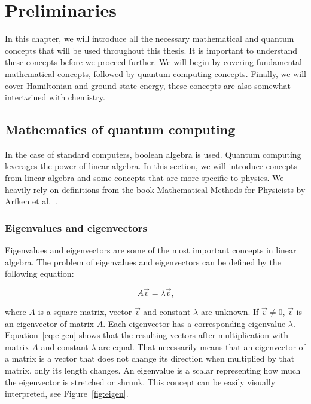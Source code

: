 \graphicspath{ {../images/}}

\chapter{Preliminaries}\label{ch:preliminaries}
In this chapter, we will introduce all the necessary mathematical and quantum concepts that will be used throughout this thesis. It is important to understand these concepts before we proceed further. We will begin by covering fundamental mathematical concepts, followed by quantum computing concepts. Finally, we will cover Hamiltonian and ground state energy, these concepts are also somewhat intertwined with chemistry.

\section{Mathematics of quantum computing}
In the case of standard computers, boolean algebra is used. Quantum computing leverages the power of linear algebra. In this section, we will introduce concepts from linear algebra and some concepts that are more specific to physics. We heavily rely on definitions from the book Mathematical Methods for Physicists by Arfken et al.~\cite{mmp}.

\subsection*{Eigenvalues and eigenvectors}
Eigenvalues and eigenvectors are some of the most important concepts in linear algebra. The problem of eigenvalues and eigenvectors can be defined by the following equation:

\begin{equation}
  A\vec{v} = \lambda \vec{v}\text{,}
  \label{eq:eigen}
\end{equation}

\noindent where $A$ is a square matrix, vector $\vec{v}$ and constant $\lambda$ are unknown. If $\vec{v} \neq 0$, $\vec{v}$ is an eigenvector of matrix $A$. Each eigenvector has a corresponding eigenvalue $\lambda$. Equation~\ref{eq:eigen} shows that the resulting vectors after multiplication with matrix $A$ and constant $\lambda$ are equal. That necessarily means that an eigenvector of a matrix is a vector that does not change its direction when multiplied by that matrix, only its length changes. An eigenvalue is a scalar representing how much the eigenvector is stretched or shrunk. This concept can be easily visually interpreted, see Figure~\ref{fig:eigen}.

